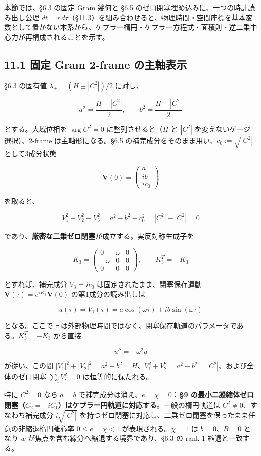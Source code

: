 \documentclass[
  a4paper,
]{ltjsarticle}
\begin{document}
本節では、§6.3 の固定 Gram 幾何と §6.5
のゼロ閉塞埋め込みに、一つの時計読み出し公理
\(dt=r\,d\tau\)（§11.3）を組み合わせると、物理時間・空間座標を基本変数として置かない本系から、ケプラー楕円・ケプラー方程式・面積則・逆二乗中心力が再構成されることを示す。

\subsection{11.1 固定 Gram 2-frame
の主軸表示}\label{ux56faux5b9a-gram-2-frame-ux306eux4e3bux8ef8ux8868ux793a}

§6.3 の固有値 \(\lambda_\pm=(H\pm|C^2|)/2\) に対し、

\[
a^2=\frac{H+|C^2|}{2},
\qquad
b^2=\frac{H-|C^2|}{2}
\]

とする。大域位相を \(\arg C^2=0\) に整列させると（\(H\) と \(|C^2|\)
を変えないゲージ選択）、2-frame は主軸形になる。§6.5
の補完成分をそのまま用い、\(c_0:=\sqrt{|C^2|}\) として3成分状態

\[
\boxed{
\mathbf V(0)=
\begin{pmatrix}
a\\ ib\\ ic_0
\end{pmatrix}
}
\]

を取ると、

\[
V_1^2+V_2^2+V_3^2=a^2-b^2-c_0^2=|C^2|-|C^2|=0
\]

であり、\textbf{厳密な二乗ゼロ閉塞}が成立する。実反対称生成子を

\[
\boxed{
K_3=
\begin{pmatrix}
0&\omega&0\\
-\omega&0&0\\
0&0&0
\end{pmatrix}
},
\qquad K_3^T=-K_3
\]

とすれば、補完成分 \(V_3=ic_0\) は固定されたまま、閉塞保存運動
\(\mathbf V(\tau)=e^{\tau K_3}\mathbf V(0)\) の第1成分の読み出しは

\[
\boxed{
u(\tau)=V_1(\tau)=a\cos(\omega\tau)+ib\sin(\omega\tau)
}
\]

となる。ここで \(\tau\)
は外部物理時間ではなく、閉塞保存軌道のパラメータである。\(K_3^T=-K_3\)
から直接

\[
u''=-\omega^2u
\]

が従い、この間
\(|V_1|^2+|V_2|^2=a^2+b^2=H\)、\(V_1^2+V_2^2=a^2-b^2=|C^2|\)、および全体のゼロ閉塞
\(\sum_iV_i^2=0\) は恒等的に保たれる。

特に \(C^2=0\) なら \(a=b\) で補完成分は消え、\(e=\chi=0\)：\textbf{§9
の最小二凝縮体ゼロ閉塞（\(C_2=\pm iC_1\)）はケプラー円軌道に対応する}。一般の楕円軌道は
\(C^2\neq0\)、すなわち補完成分 \(i\sqrt{|C^2|}\)
を持つゼロ閉塞に対応し、二乗ゼロ閉塞を保ったまま任意の非縮退楕円離心率
\(0\le e=\chi<1\) が表現される。\(\chi=1\) は \(b=0\)、\(B=0\) となり
\(w\) が焦点を含む線分へ縮退する境界であり、§6.3 の rank-1
縮退と一致する。
\end{document}
